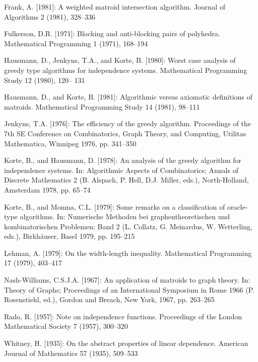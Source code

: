 {\small\setlength{\parindent}{0pt}\setlength{\parskip}{5pt}\sloppy
Frank, A. [1981]: A weighted matroid intersection algorithm. Journal of Algorithms 2 (1981), 328–336\par
Fulkerson, D.R. [1971]: Blocking and anti-blocking pairs of polyhedra. Mathematical Programming 1 (1971), 168–194\par
Hausmann, D., Jenkyns, T.A., and Korte, B. [1980]: Worst case analysis of greedy type algorithms for independence systems. Mathematical Programming Study 12 (1980), 120– 131\par
Hausmann, D., and Korte, B. [1981]: Algorithmic versus axiomatic definitions of matroids. Mathematical Programming Study 14 (1981), 98–111\par
Jenkyns, T.A. [1976]: The efficiency of the greedy algorithm. Proceedings of the 7th SE Conference on Combinatorics, Graph Theory, and Computing, Utilitas Mathematica, Winnipeg 1976, pp. 341–350\par
Korte, B., and Hausmann, D. [1978]: An analysis of the greedy algorithm for independence systems. In: Algorithmic Aspects of Combinatorics; Annals of Discrete Mathematics 2 (B. Alspach, P. Hell, D.J. Miller, eds.), North-Holland, Amsterdam 1978, pp. 65–74\par
Korte, B., and Monma, C.L. [1979]: Some remarks on a classification of oracle-type algorithms. In: Numerische Methoden bei graphentheoretischen und kombinatorischen Problemen; Band 2 (L. Collatz, G. Meinardus, W. Wetterling, eds.), Birkhäuser, Basel 1979, pp. 195–215\par
Lehman, A. [1979]: On the width-length inequality. Mathematical Programming 17 (1979), 403–417\par
Nash-Williams, C.S.J.A. [1967]: An application of matroids to graph theory. In: Theory of Graphs; Proceedings of an International Symposium in Rome 1966 (P. Rosenstiehl, ed.), Gordon and Breach, New York, 1967, pp. 263–265\par
Rado, R. [1957]: Note on independence functions. Proceedings of the London Mathematical Society 7 (1957), 300–320\par
Whitney, H. [1935]: On the abstract properties of linear dependence. American Journal of Mathematics 57 (1935), 509–533\par
}
